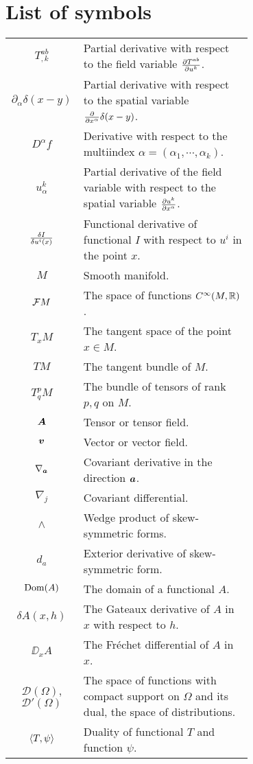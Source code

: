\chapter*{List of symbols}
\noindent\vspace{-2\baselineskip}
{\renewcommand{\arraystretch}{1.3}
\begin{table}[h!]
    \begin{tabular}{c|p{0.7\linewidth}}
        $T^{ab}_{,k}$ & Partial derivative with respect to the field variable $\frac{\partial T^{ab}}{\partial u^k}$. \\
        $\partial_\alpha \delta(x-y)$ & Partial derivative with respect to the spatial variable $\frac{\partial }{\partial x^\alpha} \delta(x-y)$. \\
        $D^\alpha f$ & Derivative with respect to the multiindex $\alpha = (\alpha_1, \cdots, \alpha_k)$.\\
        $u^k_\alpha$ & Partial derivative of the field variable with respect to the spatial variable $\frac{\partial u^k}{\partial x^\alpha}$. \\
        $\frac{\delta I}{\delta u^i(x)}$ & Functional derivative of functional $I$ with respect to $u^i$ in the point $x$. \\
        $M$ & Smooth manifold. \\
        $\mathcal{F} M$ & The space of functions $C^\infty(M, \mathbb{R})$. \\
        $T_x M$ & The tangent space of the point $x \in M$. \\
        $TM$ & The tangent bundle of $M$. \\
        $T^p_q M$ & The bundle of tensors of rank $p,q$ on $M$. \\
        $\boldsymbol{A}$ & Tensor or tensor field. \\
        $\boldsymbol{v}$ & Vector or vector field. \\
        $\nabla_{\boldsymbol{a}}$ & Covariant derivative in the direction $\boldsymbol{a}$. \\
        $\nabla_j$ & Covariant differential. \\
        $\wedge$ & Wedge product of skew-symmetric forms. \\
        $d_a$ & Exterior derivative of skew-symmetric form. \\
        $\mathrm{Dom}(A)$ & The domain of a functional $A$. \\
        $\delta A(x,h)$ & The Gateaux derivative of $A$ in $x$ with respect to $h$. \\
        $\DD_x A$ & The Fréchet differential of $A$ in $x$. \\
        $\mathcal{D}(\Omega)$, $\mathcal{D}'(\Omega)$ & The space of functions with compact support on $\Omega$ and its dual, the space of distributions. \\
        $\left \langle T ,\psi \right \rangle$ & Duality of functional $T$ and function $\psi$.
    \end{tabular}
\end{table}
}


